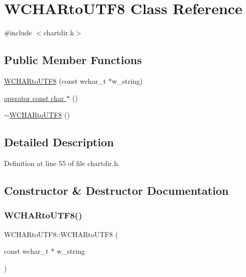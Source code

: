 \hypertarget{class_w_c_h_a_rto_u_t_f8}{}\section{W\+C\+H\+A\+Rto\+U\+T\+F8 Class Reference}
\label{class_w_c_h_a_rto_u_t_f8}


{\ttfamily \#include $<$chartdir.\+h$>$}

\subsection*{Public Member Functions}
\begin{DoxyCompactItemize}
\item 
\hyperlink{class_w_c_h_a_rto_u_t_f8_a9205e45f77838fe27b733f8536f0d9c4}{W\+C\+H\+A\+Rto\+U\+T\+F8} (const wchar\+\_\+t $\ast$w\+\_\+string)
\item 
\hyperlink{class_w_c_h_a_rto_u_t_f8_a98eaf37924edf3c9b05e6b8eba2b4e8b}{operator const char $\ast$} ()
\item 
\hyperlink{class_w_c_h_a_rto_u_t_f8_a030e6ed95f93a6be5d9083e95f8f3f1d}{$\sim$\+W\+C\+H\+A\+Rto\+U\+T\+F8} ()
\end{DoxyCompactItemize}


\subsection{Detailed Description}


Definition at line 55 of file chartdir.\+h.



\subsection{Constructor \& Destructor Documentation}
\mbox{\label{class_w_c_h_a_rto_u_t_f8_a9205e45f77838fe27b733f8536f0d9c4}} 
\subsubsection{\texorpdfstring{W\+C\+H\+A\+Rto\+U\+T\+F8()}{WCHARtoUTF8()}}
{\footnotesize\ttfamily W\+C\+H\+A\+Rto\+U\+T\+F8\+::\+W\+C\+H\+A\+Rto\+U\+T\+F8 (\begin{DoxyParamCaption}\item[{const wchar\+\_\+t $\ast$}]{w\+\_\+string }\end{DoxyParamCaption})\hspace{0.3cm}{\ttfamily [inline]}}



